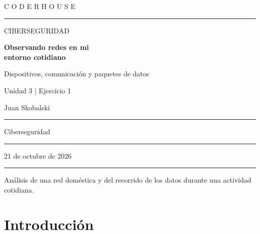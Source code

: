 \documentclass[11pt,a4paper]{article}
\begin{document}
\thispagestyle{empty}
\vspace*{1.0cm}
{\color{turquesa}\large C O D E R H O U S E}\par
\vspace{0.4cm}
{\color{linea}\rule{\textwidth}{1.2pt}}\par
\vspace{2.3cm}
{\color{gris}\Large CIBERSEGURIDAD}\par
\vspace{0.45cm}
{\color{azul}\Huge\bfseries Observando redes en mi\\[5pt] entorno cotidiano}\par
\vspace{0.45cm}
{\color{turquesa}\LARGE Dispositivos, comunicación y paquetes de datos}\par
\vspace{1.0cm}
{\color{gris}\large Unidad 3 | Ejercicio 1}\par

\vfill
\noindent\colorbox{fondo}{%
  \begin{minipage}{\dimexpr\textwidth-2\fboxsep}
    \vspace{0.28cm}
    \noindent{}Juan Skobalski\par
    \vspace{0.18cm}\color{linea}\hrule\color{black}\vspace{0.18cm}
    \noindent{}Ciberseguridad\par
    \vspace{0.18cm}\color{linea}\hrule\color{black}\vspace{0.18cm}
    \noindent{}21 de octubre de 2026\par
    \vspace{0.28cm}
  \end{minipage}}
\vspace{0.75cm}
{\color{linea}\rule{\textwidth}{1.2pt}}\par
\vspace{0.25cm}
{\small\color{gris}Análisis de una red doméstica y del recorrido de los datos durante una actividad cotidiana.}

\newpage
\section*{Introducción}
\leavevmode\par
\end{document}
